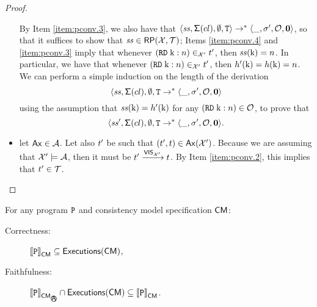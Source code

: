 \begin{proof}
\begin{itemize}
By Item \eqref{item:pconv.3}, 
we also have that $\langle \mathit{ss}, \mathsf{\Sigma}(cl), \emptyset, \texttt{T} \rangle 
\rightarrow^{\ast} \langle \_, \sigma', \mathcal{O}, \mathbf{0} \rangle$, so that it suffices 
to show that $\mathit{ss} \in \mathsf{RP}(\mathcal{X}, \mathcal{T})$;  Items \eqref{item:pconv.4} and \eqref{item:pconv.3} imply that whenever $({{\tt RD}}\; \mathrm{k}: n) \in_{\mathcal{X}'} t'$, 
then  $\mathit{ss}(\mathrm{k}) = n$. In particular, we have that whenever $({{\tt RD}}\;\mathrm{k}: n) \in_{\mathcal{X}'} t'$, then
$h'(\mathrm{k}) = h(\mathrm{k}) = n$. We can perform a simple induction on the length of the derivation 
\[
\langle \mathit{ss}, \mathsf{\Sigma}(cl), \emptyset, \texttt{T} 
\rightarrow^{\ast} \langle \_, \sigma', \mathcal{O}, \mathbf{0} \rangle
\]
using the assumption that $\mathit{ss}(\mathrm{k}) = h'(\mathrm{k})$ for any $({{\tt RD}}\;\mathrm{k}: n) \in \mathcal{O}$, to 
prove that
\[
\langle \mathit{ss}', \mathsf{\Sigma}(cl), \emptyset, \texttt{T} 
\rightarrow^{\ast} \langle \_, \sigma', \mathcal{O}, \mathbf{0} \rangle.
\]

\item let $\mathsf{Ax} \in \mathcal{A}$. Let also $t'$ be such that $(t', t) \in \mathsf{Ax}(\mathcal{X}')$. Because 
we are assuming that $\mathcal{X}' \models \mathcal{A}$, then it must be $t' \xrightarrow{{\mathsf{VIS}}_{\mathcal{X}'}} t$. 
By Item \eqref{item:pconv.2}, this implies that $t' \in \mathcal{T}$.
\end{itemize}
\end{proof}

\begin{theorem}
For any program $\texttt{P}$ and consistency model specification 
$\mathsf{CM}$: 
\begin{description}
\item[Correctness: ] ${\llbracket \texttt{P} \rrbracket}_{\mathsf{CM}} \subseteq {\mathsf{Executions}}(\mathsf{CM})$, 
\item[Faithfulness: ] $\interpr{\prog}_{\CM_{\anarchicsmall}} \cap \aeset(\CM) \subseteq \interpr{\prog}_{\CM}$. 
\end{description}
\end{theorem}

